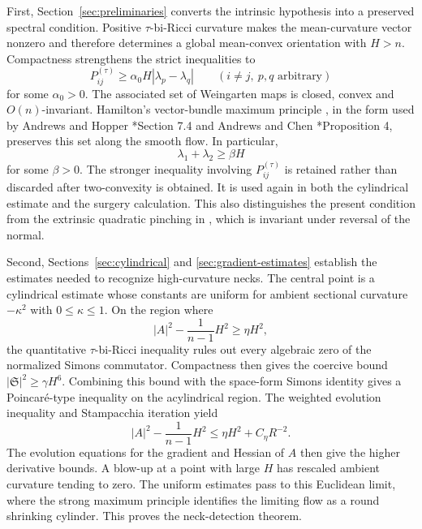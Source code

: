 \documentclass[11pt,reqno]{amsart}
\theoremstyle{definition}
\theoremstyle{remark}
\numberwithin{equation}{section}
\begin{document}
First, Section~\ref{sec:preliminaries} converts the intrinsic hypothesis into
a preserved spectral condition.  Positive $\tau$-bi-Ricci curvature makes
the mean-curvature vector nonzero and therefore determines a global
mean-convex orientation with $H>n$.  Compactness
strengthens the strict inequalities to
\begin{equation*}
 P_{ij}^{(\tau)}
 \geq\alpha_0H|\lambda_p-\lambda_q|
 \qquad(i\ne j,\ p,q\text{ arbitrary})
\end{equation*}
for some $\alpha_0>0$.  The associated set of Weingarten maps is closed,
convex and $O(n)$-invariant.  Hamilton's vector-bundle maximum principle
\cite{Ham86}, in the form used by Andrews and Hopper \cite{AH11}*{Section 7.4} and Andrews
and Chen \cite{AC17}*{Proposition 4}, preserves this set along the smooth flow.  In
particular,
\begin{equation*}
 \lambda_1+\lambda_2\geq\beta H
\end{equation*}
for some $\beta>0$.  The stronger inequality involving $P_{ij}^{(\tau)}$ is
retained rather than discarded after two-convexity is obtained.  It is used
again in both the cylindrical estimate and the surgery calculation.  This
also distinguishes the present condition from the extrinsic quadratic
pinching in \cite{LN21}, which is invariant under reversal of the normal.

Second, Sections~\ref{sec:cylindrical} and
\ref{sec:gradient-estimates} establish the estimates needed to recognize
high-curvature necks.  The central point is a cylindrical estimate whose
constants are uniform for ambient sectional curvature $-\kappa^2$ with
$0\leq\kappa\leq1$.  On the region where
\begin{equation*}
 |A|^2-\frac1{n-1}H^2\geq\eta H^2,
\end{equation*}
the quantitative $\tau$-bi-Ricci inequality rules out every algebraic zero of
the normalized Simons commutator.  Compactness then gives the coercive bound
$|\mathfrak S|^2\geq\gamma H^6$.  Combining this bound with the space-form
Simons identity gives a Poincar\'e-type inequality on the acylindrical region.
The weighted evolution inequality and Stampacchia iteration yield
\begin{equation*}
 |A|^2-\frac1{n-1}H^2
 \leq\eta H^2+C_\eta R^{-2}.
\end{equation*}
The evolution equations for the gradient and Hessian of $A$ then give the
higher derivative bounds.  A blow-up at a point with large $H$ has rescaled
ambient curvature tending to zero.  The uniform estimates pass to this
Euclidean limit, where the strong maximum principle identifies the limiting
flow as a round shrinking cylinder.  This proves the neck-detection theorem.
\end{document}

